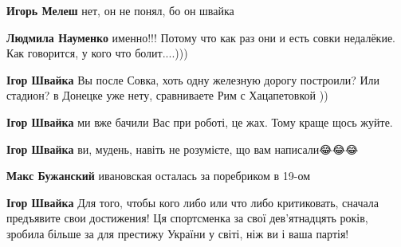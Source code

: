 \begin{itemize}
\begin{itemize}
\textbf{Игорь Мелеш} нет, он не понял, бо он швайка

 
\textbf{Людмила Науменко} именно!!! Потому что как раз они и есть совки недалёкие. Как говорится, у кого что болит....)))

 
\textbf{Ігор Швайка} Вы после Совка, хоть одну железную дорогу построили? Или стадион? в Донецке уже нету, сравниваете Рим с Хацапетовкой ))

 
\textbf{Ігор Швайка} ми вже бачили Вас при роботі, це жах. Тому краще щось жуйте.

 
\textbf{Ігор Швайка} ви, мудень, навіть не розумієте, що вам написали😂😂😂

 
\textbf{Макс Бужанский} ивановская осталась за поребриком в 19-ом

 
\textbf{Ігор Швайка}
Для того, чтобы кого либо или что либо критиковать, сначала предъявите свои достижения!
Ця спортсменка за свої дев'ятнадцять років, зробила більше за для престижу України у світі, ніж ви і ваша партія!


\end{itemize}
\end{itemize}

